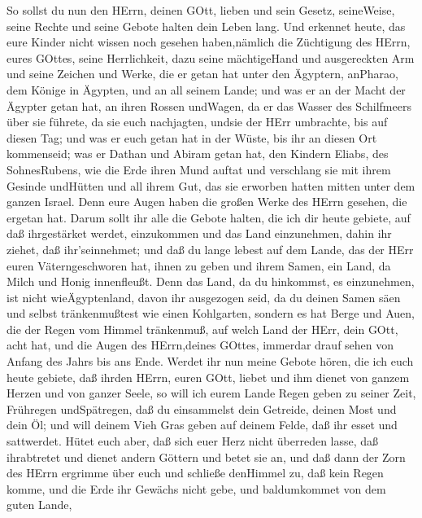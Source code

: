  So sollst du nun den HErrn, deinen GOtt, lieben und sein
Gesetz, seineWeise, seine Rechte und seine Gebote halten dein Leben
lang.  Und erkennet heute, das eure Kinder nicht wissen noch
gesehen haben,nämlich die Züchtigung des HErrn, eures GOttes, seine
Herrlichkeit, dazu seine mächtigeHand und ausgereckten Arm 
und seine Zeichen und Werke, die er getan hat unter den Ägyptern,
anPharao, dem Könige in Ägypten, und an all seinem Lande; 
und was er an der Macht der Ägypter getan hat, an ihren Rossen undWagen,
da er das Wasser des Schilfmeers über sie führete, da sie euch
nachjagten, undsie der HErr umbrachte, bis auf diesen Tag; 
und was er euch getan hat in der Wüste, bis ihr an diesen Ort
kommenseid;  was er Dathan und Abiram getan hat, den Kindern
Eliabs, des SohnesRubens, wie die Erde ihren Mund auftat und verschlang
sie mit ihrem Gesinde undHütten und all ihrem Gut, das sie erworben
hatten mitten unter dem ganzen Israel.  Denn eure Augen
haben die großen Werke des HErrn gesehen, die ergetan hat. 
Darum sollt ihr alle die Gebote halten, die ich dir heute gebiete, auf
daß ihrgestärket werdet, einzukommen und das Land einzunehmen, dahin ihr
ziehet, daß ihr'seinnehmet;  und daß du lange lebest auf dem
Lande, das der HErr euren Väterngeschworen hat, ihnen zu geben und ihrem
Samen, ein Land, da Milch und Honig innenfleußt.  Denn das
Land, da du hinkommst, es einzunehmen, ist nicht wieÄgyptenland, davon
ihr ausgezogen seid, da du deinen Samen säen und selbst tränkenmußtest
wie einen Kohlgarten,  sondern es hat Berge und Auen, die
der Regen vom Himmel tränkenmuß,  auf welch Land der HErr,
dein GOtt, acht hat, und die Augen des HErrn,deines GOttes, immerdar
drauf sehen von Anfang des Jahrs bis ans Ende.  Werdet ihr
nun meine Gebote hören, die ich euch heute gebiete, daß ihrden HErrn,
euren GOtt, liebet und ihm dienet von ganzem Herzen und von ganzer
Seele,  so will ich eurem Lande Regen geben zu seiner Zeit,
Frühregen undSpätregen, daß du einsammelst dein Getreide, deinen Most
und dein Öl;  und will deinem Vieh Gras geben auf deinem
Felde, daß ihr esset und sattwerdet.  Hütet euch aber, daß
sich euer Herz nicht überreden lasse, daß ihrabtretet und dienet andern
Göttern und betet sie an,  und daß dann der Zorn des HErrn
ergrimme über euch und schließe denHimmel zu, daß kein Regen komme, und
die Erde ihr Gewächs nicht gebe, und baldumkommet von dem guten Lande,
